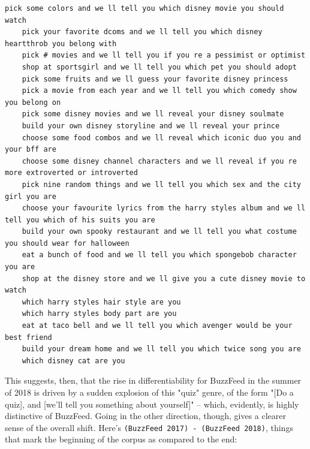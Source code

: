 \documentclass{scrartcl}
\begin{document}
\begin{lstlisting}[basicstyle=\tiny\hlfont]
    pick some colors and we ll tell you which disney movie you should watch
    pick your favorite dcoms and we ll tell you which disney heartthrob you belong with
    pick # movies and we ll tell you if you re a pessimist or optimist
    shop at sportsgirl and we ll tell you which pet you should adopt
    pick some fruits and we ll guess your favorite disney princess
    pick a movie from each year and we ll tell you which comedy show you belong on
    pick some disney movies and we ll reveal your disney soulmate
    build your own disney storyline and we ll reveal your prince
    choose some food combos and we ll reveal which iconic duo you and your bff are
    choose some disney channel characters and we ll reveal if you re more extroverted or introverted
    pick nine random things and we ll tell you which sex and the city girl you are
    choose your favourite lyrics from the harry styles album and we ll tell you which of his suits you are
    build your own spooky restaurant and we ll tell you what costume you should wear for halloween
    eat a bunch of food and we ll tell you which spongebob character you are
    shop at the disney store and we ll give you a cute disney movie to watch
    which harry styles hair style are you
    which harry styles body part are you
    eat at taco bell and we ll tell you which avenger would be your best friend
    build your dream home and we ll tell you which twice song you are
    which disney cat are you
\end{lstlisting}

This suggests, then, that the rise in differentiability for BuzzFeed in the summer of 2018 is driven by a sudden explosion of this "quiz" genre, of the form "[Do a quiz], and [we'll tell you something about yourself]" -- which, evidently, is highly distinctive of BuzzFeed. Going in the other direction, though, gives a clearer sense of the overall shift. Here's \texttt{(BuzzFeed 2017) - (BuzzFeed 2018)}, things that mark the beginning of the corpus as compared to the end:
\end{document}
